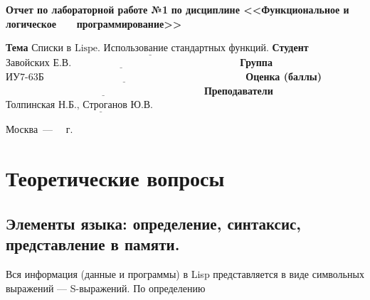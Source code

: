 \documentclass[12pt]{report}
\begin{document}
\begin{titlepage}
		\begin{center}
			\noindent\begin{minipage}{1.1\textwidth}\centering
				\Large\textbf{  Отчет по лабораторной работе №1}\newline
				\textbf{по дисциплине <<Функциональное и логическое}\newline
				\textbf{~~~программирование>>}\newline\newline
			\end{minipage}
		\end{center}
		
		\noindent\textbf{Тема} $\underline{\text{Списки в Lispe. Использование стандартных функций.}}$\newline\newline
		\noindent\textbf{Студент} $\underline{\text{Завойских Е.В.~~~~~~~~~~~~~~~~~~~~~~~~~~~~~~~~~~~~~~~~~~~~~~~~~~}}$\newline\newline
		\noindent\textbf{Группа} $\underline{\text{ИУ7-63Б~~~~~~~~~~~~~~~~~~~~~~~~~~~~~~~~~~~~~~~~~~~~~~~~~~~~~~~~~~~~}}$\newline\newline
		\noindent\textbf{Оценка (баллы)} $\underline{\text{~~~~~~~~~~~~~~~~~~~~~~~~~~~~~~~~~~~~~~~~~~~~~~~~~~~~~~~~~~~}}$\newline\newline
		\noindent\textbf{Преподаватели} $\underline{\text{Толпинская Н.Б., Строганов Ю.В.~~~~~~~~~~~~~}}$\newline\newline\newline
		
		\begin{center}
			\vfill
			Москва~---~\the\year
			~г.
		\end{center}
	\end{titlepage}
	
\chapter{Теоретические вопросы}
	
\section{Элементы языка: определение, синтаксис, представление в памяти.}
Вся информация (данные и программы) в Lisp представляется в виде символьных выражений --- S-выражений. По определению
\end{document}
